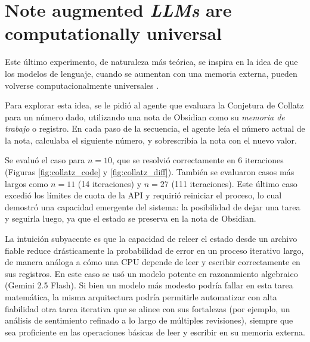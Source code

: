 
\section{Note augmented \textit{LLMs} are computationally universal}
Este último experimento, de naturaleza más teórica, se inspira en la idea de que los modelos de lenguaje, cuando se aumentan con una memoria externa, pueden volverse computacionalmente universales \parencite{schuurmansMemoryAugmentedLarge2023}.

Para explorar esta idea, se le pidió al agente que evaluara la Conjetura de Collatz para un número dado, utilizando una nota de Obsidian como su \textit{memoria de trabajo} o registro. En cada paso de la secuencia, el agente leía el número actual de la nota, calculaba el siguiente número, y sobrescribía la nota con el nuevo valor.

Se evaluó el caso para $n=10$, que se resolvió correctamente en 6 iteraciones (Figuras \ref{fig:collatz_code} y \ref{fig:collatz_diff}). También se evaluaron casos más largos como $n=11$ (14 iteraciones) y $n=27$ (111 iteraciones). Este último caso excedió los límites de cuota de la API y requirió reiniciar el proceso, lo cual demostró una capacidad emergente del sistema: la posibilidad de dejar una tarea y seguirla luego, ya que el estado se preserva en la nota de Obsidian.

La intuición subyacente es que la capacidad de releer el estado desde un archivo fiable reduce drásticamente la probabilidad de error en un proceso iterativo largo, de manera análoga a cómo una CPU depende de leer y escribir correctamente en sus registros. En este caso se usó un modelo potente en razonamiento algebraico (Gemini 2.5 Flash). Si bien un modelo más modesto podría fallar en esta tarea matemática, la misma arquitectura podría permitirle automatizar con alta fiabilidad otra tarea iterativa que se alinee con sus fortalezas (por ejemplo, un análisis de sentimiento refinado a lo largo de múltiples revisiones), siempre que sea proficiente en las operaciones básicas de leer y escribir en su memoria externa.

